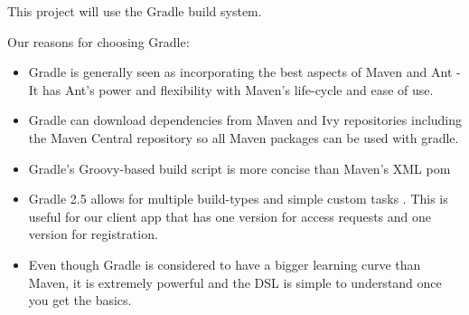 This project will use the Gradle build system.

Our reasons for choosing Gradle:
\begin{itemize}
	\item Gradle is generally seen as incorporating the best aspects of Maven and Ant -  It has Ant’s power and flexibility with Maven’s life-cycle and ease of use. \cite{Farcic2014, Timosin2013}
	\item Gradle can download dependencies from Maven and Ivy repositories including the Maven Central repository so all Maven packages can be used with gradle. \cite{GradleDocChap8}
	\item Gradle's Groovy-based build script is more concise than Maven's XML pom \cite{Farcic2014}
	\item Gradle 2.5 allows for multiple build-types and simple custom tasks \cite{GradleChap55}. This is useful for our client app that has one version for access requests and one version for registration.
	\item Even though Gradle is considered to have a bigger learning curve than Maven, it is extremely powerful \cite{Timosin2013} and the DSL is simple to understand once you get the basics. \cite{Farcic2014}
	
\end{itemize}


